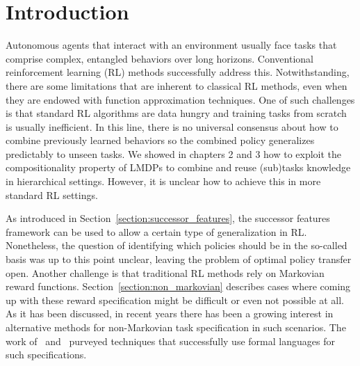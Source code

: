 \section{Introduction}

Autonomous agents that interact with an environment usually face tasks that comprise complex, entangled behaviors over long horizons. Conventional reinforcement learning (RL) methods successfully address this. Notwithstanding, there are some limitations that are inherent to classical RL methods, even when they are endowed with function approximation techniques. One of such challenges is that standard RL algorithms are data hungry and training tasks from scratch is usually inefficient. In this line, there is no universal consensus about how to combine previously learned behaviors so the combined policy generalizes predictably to unseen tasks. We showed in chapters 2 and 3 how to exploit the compositionality property of LMDPs to combine and reuse (sub)tasks knowledge in hierarchical settings. However, it is unclear how to achieve this in more standard RL settings. 

As introduced in Section~\ref{section:successor_features}, the successor features framework can be used to allow a certain type of generalization in RL. Nonetheless, the question of identifying which policies should be in the so-called basis was up to this point unclear, leaving the problem of optimal policy transfer open. Another challenge is that traditional RL methods rely on Markovian reward functions. Section~\ref{section:non_markovian} describes cases where coming up with these reward specification might be difficult or even not possible at all. As it has been discussed, in recent years there has been a growing interest in alternative methods for non-Markovian task specification in such scenarios. The work of~\citet{Camacho2019} and~\citet{Icarte2022} purveyed techniques that successfully use formal languages for such specifications. 

